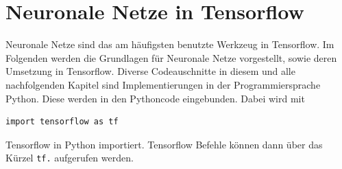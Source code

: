 \chapter{Neuronale Netze in Tensorflow}
Neuronale Netze sind das am häufigsten benutzte Werkzeug in Tensorflow. Im Folgenden werden die Grundlagen für Neuronale Netze vorgestellt, sowie deren Umsetzung in Tensorflow. Diverse Codeauschnitte in diesem und alle nachfolgenden Kapitel sind Implementierungen in der Programmiersprache Python. Diese werden in den Pythoncode eingebunden. Dabei wird mit \cite{cookbook}
\begin{lstlisting}
import tensorflow as tf
\end{lstlisting} Tensorflow in Python importiert. Tensorflow Befehle können dann über das Kürzel \lstinline$tf.$ aufgerufen werden.

